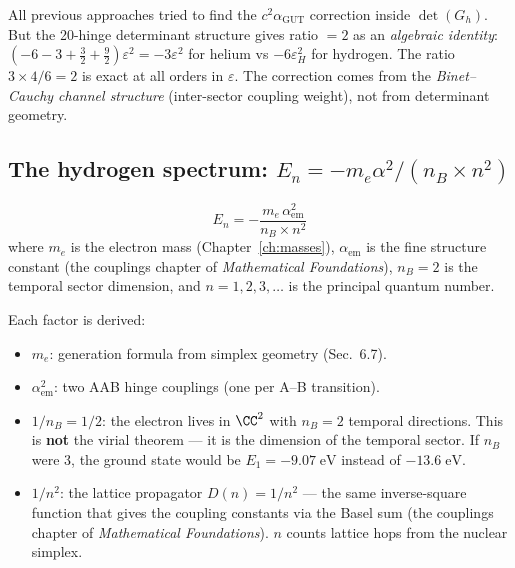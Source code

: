 \begin{remark}
All previous approaches tried to find the $c^2\alpha_\text{GUT}$ correction inside $\det(G_h)$.  But the 20-hinge determinant structure gives ratio $= 2$ as an \emph{algebraic identity}: $(-6 - 3 + \tfrac{3}{2} + \tfrac{9}{2})\varepsilon^2 = -3\varepsilon^2$ for helium vs $-6\varepsilon_H^2$ for hydrogen.  The ratio $3 \times 4 / 6 = 2$ is exact at all orders in $\varepsilon$.  The correction comes from the \emph{Binet--Cauchy channel structure} (inter-sector coupling weight), not from determinant geometry.
\end{remark}

\subsection{The hydrogen spectrum: $E_n = -m_e\alpha^2/(n_B \times n^2)$}

\begin{theorem}
\begin{equation}
\boxed{E_n = -\frac{m_e\,\alpha_\text{em}^2}{n_B \times n^2}}
\end{equation}
where $m_e$ is the electron mass (Chapter~\ref{ch:masses}), $\alpha_\text{em}$ is the fine structure constant (the couplings chapter of \textit{Mathematical Foundations}), $n_B = 2$ is the temporal sector dimension, and $n = 1, 2, 3, \ldots$ is the principal quantum number.
\end{theorem}

Each factor is derived:
\begin{itemize}
\item $m_e$: generation formula from simplex geometry (Sec.~6.7).
\item $\alpha_\text{em}^2$: two AAB hinge couplings (one per A--B transition).
\item $1/n_B = 1/2$: the electron lives in $\CC^2$ with $n_B = 2$ temporal directions. This is \textbf{not} the virial theorem --- it is the dimension of the temporal sector. If $n_B$ were 3, the ground state would be $E_1 = -9.07\;\text{eV}$ instead of $-13.6\;\text{eV}$.
\item $1/n^2$: the lattice propagator $D(n) = 1/n^2$ --- the same inverse-square function that gives the coupling constants via the Basel sum (the couplings chapter of \textit{Mathematical Foundations}). $n$ counts lattice hops from the nuclear simplex.
\end{itemize}

